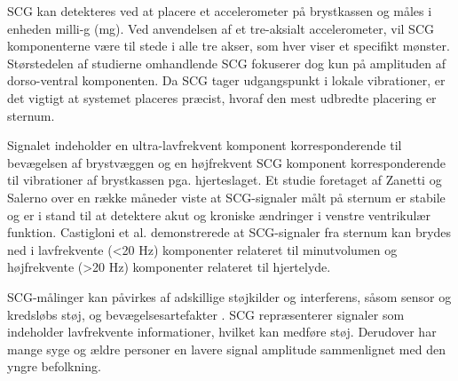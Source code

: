 
SCG kan detekteres ved at placere et accelerometer på brystkassen og måles i enheden milli-g (mg). Ved anvendelsen af et tre-aksialt accelerometer, vil SCG komponenterne være til stede i alle tre akser, som hver viser et specifikt mønster. \cite{migeotte2012} Størstedelen af studierne omhandlende SCG fokuserer dog kun på amplituden af dorso-ventral komponenten. Da SCG tager udgangspunkt i lokale vibrationer, er det vigtigt at systemet placeres præcist, hvoraf den mest udbredte placering er sternum. \cite{pandia2012}

Signalet indeholder en ultra-lavfrekvent komponent korresponderende til bevægelsen af brystvæggen og en højfrekvent SCG komponent korresponderende til vibrationer af brystkassen pga. hjerteslaget. Et studie foretaget af Zanetti og Salerno \cite{zanetti1991} over en række måneder viste at SCG-signaler målt på sternum er stabile og er i stand til at detektere akut og kroniske ændringer i venstre ventrikulær funktion. Castigloni et al. \cite{castiglioni2007} demonstrerede at SCG-signaler fra sternum kan brydes ned i lavfrekvente (<20 Hz) komponenter relateret til minutvolumen og højfrekvente (>20 Hz) komponenter relateret til hjertelyde. 

SCG-målinger kan påvirkes af adskillige støjkilder og interferens, såsom sensor og kredsløbs støj, og bevægelsesartefakter \cite{pandia2010}. SCG repræsenterer signaler som indeholder lavfrekvente informationer, hvilket kan medføre støj. Derudover har mange syge og ældre personer en lavere signal amplitude sammenlignet med den yngre befolkning. \cite{starr1961} 

